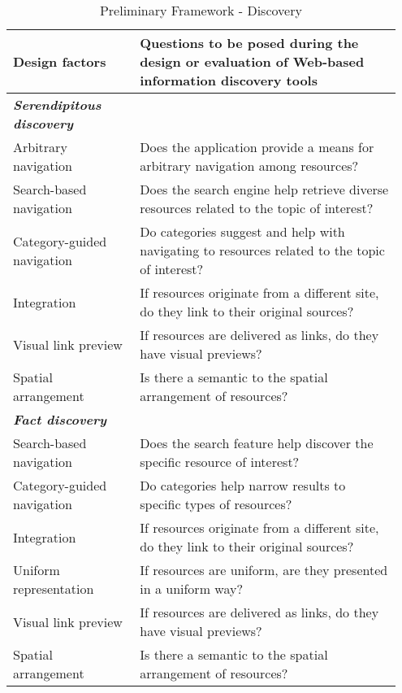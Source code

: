 \begin{table*}[htbp]
\caption{Preliminary Framework - Discovery}
\centering
\label{table:old_framework_discovery}
\footnotesize
\begin{tabular}{|p{0.31\linewidth}|p{0.64\linewidth}|}
\hline
\textbf{\small{Design factors}}   & \textbf{\small{Questions to be posed during the design or evaluation of Web-based information discovery tools 
}}  \\
\hline
\emph{\textbf{Serendipitous discovery}}     &                                                                                                           \\

Arbitrary navigation         & Does the application provide a means for arbitrary navigation among resources?                              \\
Search-based navigation      & Does the search engine help retrieve diverse resources related to the topic of interest?               \\
Category-guided navigation & Do categories suggest and help with navigating to resources related to the topic of interest?           \\
Integration                  & If resources originate from a different site, do they link to their original sources?                   \\
Visual link preview               & If resources are delivered as links, do they have visual previews?                                                                        \\
Spatial arrangement          & Is there a semantic to the spatial arrangement of resources?                                                    \\

\emph{\textbf{Fact discovery}}                &                                                                                                           \\
Search-based navigation      & Does the search feature help discover the specific resource of interest?                                  \\
Category-guided navigation & Do categories help narrow results to specific types of resources?                                   \\
Integration                  & If resources originate from a different site, do they link to their original sources?                   \\
Uniform representation       & If resources are uniform, are they presented in a uniform way? \\
Visual link preview               & If resources are delivered as links, do they have visual previews?                                                                        \\
Spatial arrangement          & Is there a semantic to the spatial arrangement of resources?                                                    \\


\end{tabular}
\end{table*}
